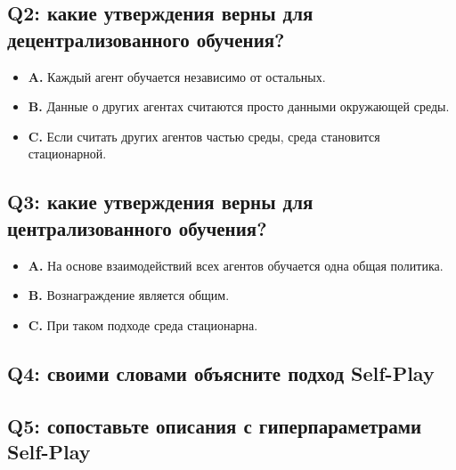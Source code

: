 \documentclass[11pt,a4paper]{article}
\begin{document}
\subsection{Q2: какие утверждения верны для децентрализованного обучения?}\label{q2-which-of-the-following-statements-are-true-about-decentralized-learning}

\begin{itemize}
\tightlist
\item
  \textbf{A.} Каждый агент обучается независимо от остальных.
\item
  \textbf{B.} Данные о других агентах считаются просто данными окружающей среды.
\item
  \textbf{C.} Если считать других агентов частью среды, среда становится стационарной.
\end{itemize}

\subsection{Q3: какие утверждения верны для централизованного обучения?}\label{q3-which-of-the-following-statements-are-true-about-centralized-learning}

\begin{itemize}
\tightlist
\item
  \textbf{A.} На основе взаимодействий всех агентов обучается одна общая политика.
\item
  \textbf{B.} Вознаграждение является общим.
\item
  \textbf{C.} При таком подходе среда стационарна.
\end{itemize}

\subsection{Q4: своими словами объясните подход Self-Play}\label{q4-explain-in-your-own-words-what-is-the-self-play-approach}

\subsection{Q5: сопоставьте описания с гиперпараметрами Self-Play}\label{q5-when-configuring-self-play-several-parameters-are-important.-could-you-identify-by-their-definition-which-parameter-are-we-talking-about}
\end{document}
